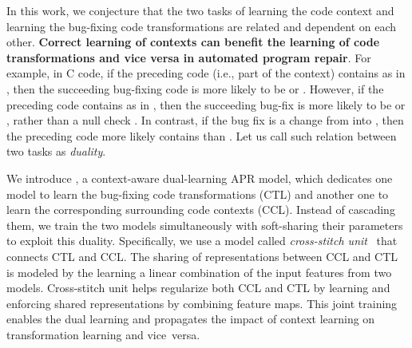 
In this work, we conjecture that the two tasks of learning the code
context and learning the bug-fixing code transformations are related
and dependent on each other. {\bf Correct learning of contexts can
  benefit the learning of code transformations and vice versa in
  automated program repair}. For example, in C code, if the
preceding code (i.e., part of the context) contains  as in
, then the succeeding
bug-fixing code is more likely to be  or
. However, if the preceding code contains
 as in , then the
succeeding bug-fix is more likely to be  or
, rather than a null check . In contrast, if the bug fix is a
change from  into , then the
preceding code more likely contains  than .
Let us call such relation between two tasks as {\em duality}.

We introduce {\tool}, a context-aware dual-learning APR model, which
dedicates one model to learn the bug-fixing code transformations
(CTL) and another one to learn the corresponding surrounding code
contexts (CCL). Instead of cascading them, we train the two models
simultaneously with soft-sharing their parameters to exploit this
duality. Specifically, we use a model called {\em cross-stitch
unit}~\cite{misra2016cross} that connects CTL and CCL. The
sharing of representations between CCL and CTL is modeled by the
learning a linear combination of the input features from two models.
Cross-stitch unit helps regularize both CCL and CTL by learning and
enforcing shared representations by combining feature maps. This joint
training enables the dual learning and propagates the impact of 
context learning on transformation learning and vice~versa.

